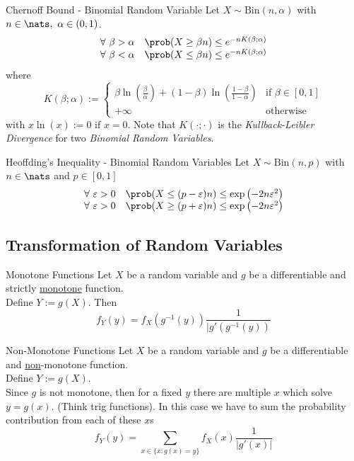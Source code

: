 \documentclass[11pt,a4paper]{article}
\begin{document}
  \begin{theorem}{Chernoff Bound - Binomial Random Variable}
    Let $X\sim\text{Bin}(n,\alpha)$ with $n\in\nats,\ \alpha\in(0,1)$.
    \[\begin{array}{rl}
      \forall\ \beta>\alpha&\prob(X\geq\beta n)\leq e^{-nK(\beta;\alpha)}\\
      \forall\ \beta<\alpha&\prob(X\leq\beta n)\leq e^{-nK(\beta;\alpha)}
    \end{array}\]
    where
    \[ K(\beta;\alpha):=\begin{cases}\beta\ln\left(\frac\beta\alpha\right)+(1-\beta)\ln\left(\frac{1-\beta}{1-\alpha}\right)&\text{if }\beta\in[0,1]\\+\infty&\text{otherwise}\end{cases} \]
    with $x\ln(x):=0$ if $x=0$. Note that $K(\cdot;\cdot)$ is the \textit{Kullback-Leibler Divergence} for two \textit{Binomial Random Variables}.
  \end{theorem}

  \begin{theorem}{Heoffding's Inequality - Binomial Random Variables}
    Let $X\sim\text{Bin}(n,p)$ with $n\in\nats$ and $p\in[0,1]$
    \[\begin{array}{rl}
      \forall\ \varepsilon>0&\prob(X\leq(p-\varepsilon)n)\leq\exp\left(-2n\varepsilon^2\right)\\
      \forall\ \varepsilon>0&\prob(X\geq(p+\varepsilon)n)\leq\exp\left(-2n\varepsilon^2\right)
    \end{array}\]
  \end{theorem}

\subsection{Transformation of Random Variables}

  \begin{theorem}{Monotone Functions}
    Let $X$ be a random variable and $g$ be a differentiable and strictly \underline{monotone} function.\\
    Define $Y:=g(X)$. Then
    \[ f_Y(y)=f_X(g^{-1}(y))\frac{1}{|g'(g^{-1}(y))} \]
  \end{theorem}

  \begin{theorem}{Non-Monotone Functions}
    Let $X$ be a random variable and $g$ be a differentiable and \underline{non}-monotone function.\\
    Define $Y:=g(X)$.\\
    Since $g$ is not monotone, then for a fixed $y$ there are multiple $x$ which solve $y=g(x)$. (Think trig functions). In this case we have to sum the probability contribution from each of these $x$s
    \[ f_Y(y)=\sum_{x\in\{x:g(x)=y\}}f_X(x)\frac{1}{|g'(x)|} \]
  \end{theorem}
\end{document}
